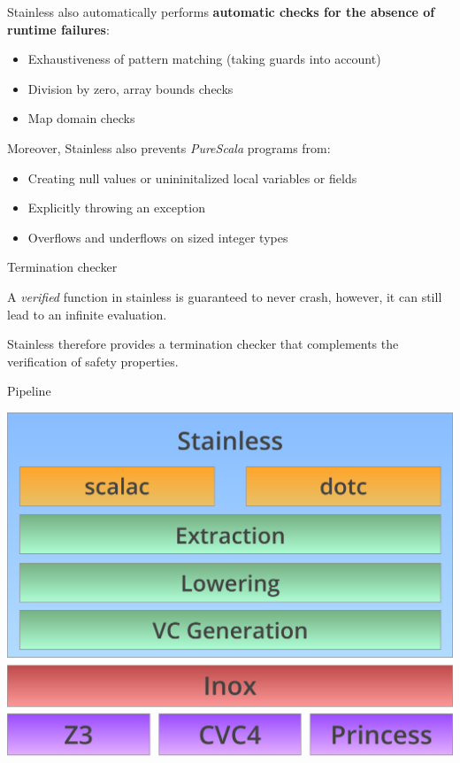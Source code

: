 \documentclass[
  ignorenonframetext,
]{beamer}
\providecommand{\tightlist}{%
  \setlength{\itemsep}{0pt}\setlength{\parskip}{0pt}}
\begin{document}
\begin{frame}

Stainless also automatically performs \textbf{automatic checks for the
absence of runtime failures}:

\begin{itemize}
\tightlist
\item
  Exhaustiveness of pattern matching (taking guards into account)
\item
  Division by zero, array bounds checks
\item
  Map domain checks
\end{itemize}

\end{frame}

\begin{frame}

Moreover, Stainless also prevents \emph{PureScala} programs from:

\begin{itemize}
\tightlist
\item
  Creating null values or unininitalized local variables or fields
\item
  Explicitly throwing an exception
\item
  Overflows and underflows on sized integer types
\end{itemize}

\end{frame}

\begin{frame}{Termination checker}
\protect\hypertarget{termination-checker}{}

A \emph{verified} function in stainless is guaranteed to never crash,
however, it can still lead to an infinite evaluation.

Stainless therefore provides a termination checker that complements the
verification of safety properties.

\end{frame}

\begin{frame}{Pipeline}
\protect\hypertarget{pipeline}{}

\includegraphics[width=\textwidth,height=0.85\textheight]{stainless.pdf}

\end{frame}
\end{document}
